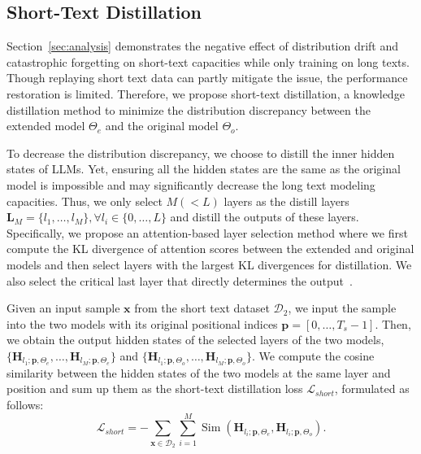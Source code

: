 \subsection{Short-Text Distillation}
Section~\ref{sec:analysis} demonstrates the negative effect of distribution drift and catastrophic forgetting on short-text capacities while only training on long texts. Though replaying short text data can partly mitigate the issue, the performance restoration is limited. Therefore, we propose short-text distillation, a knowledge distillation method to 
minimize the distribution discrepancy between the extended model $\Theta_e$ and the original model $\Theta_o$. 

 To decrease the distribution discrepancy, we choose to distill the inner hidden states of LLMs. Yet, ensuring all the hidden states are the same as the original model is impossible and may significantly decrease the long text modeling capacities. Thus, we only select  $M(<L)$ layers as the distill layers $\mathbf{L}_M=\{l_1, \dots, l_M\},\forall l_i\in \{0,\dots, L\}$ and distill the outputs of these layers. Specifically, we propose an attention-based layer selection method where we first compute the KL divergence of attention scores between the extended and original models and then select layers with the largest KL divergences for distillation. We also select the critical last layer that directly determines the output~\cite{men-arxiv-2024-shortgpt}.




Given an input sample $\bm{x}$ from the short text dataset $\mathcal D_2$, we input the sample into the two models with its original positional indices $\bm p=[0,\dots, T_s-1]$. Then, we obtain the output hidden states of the selected layers of the two models, \ie $\{\mathbf H_{l_1; \bm p, \Theta_{e}},\dots, \mathbf H_{l_M; \bm p, \Theta_{e}}\}$ and $\{\mathbf H_{l_1; \bm p, \Theta_{o}},\dots, \mathbf H_{l_M; \bm p, \Theta_{o}}\}$. We 
compute the cosine similarity between the hidden states of the two models at the same layer and position and sum up them as the short-text distillation loss $\mathcal{L}_{short}$,  formulated as follows:
\begin{equation}
    \mathcal{L}_{short} = -\sum_{\bm{x}\in \mathcal D_2} \sum_{i=1}^M\operatorname{Sim}( \mathbf H_{l_i; \bm p, \Theta_{e}}, \mathbf H_{l_i; \bm p,\Theta_{o}}).
\end{equation}



